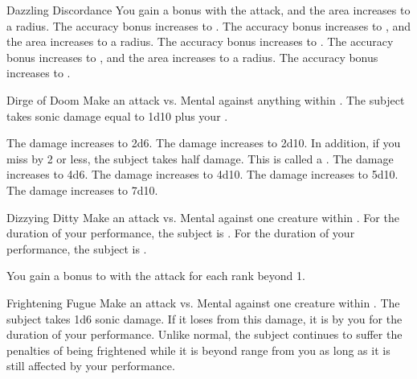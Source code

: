 {\begin{durationability}{Dazzling Discordance}
                \rankline
                 You gain a   bonus with the attack, and the area increases to a \largearea radius.
                 The accuracy bonus increases to .
                 The accuracy bonus increases to , and the area increases to a \hugearea radius.
                 The accuracy bonus increases to .
                 The accuracy bonus increases to , and the area increases to a \gargarea radius.
                 The accuracy bonus increases to .
            \end{durationability}

            \begin{instantability}{Dirge of Doom}
                \rankline
                Make an attack vs. Mental against anything within \medrange.
                \hit The subject takes sonic damage equal to 1d10 plus your .

                \rankline
                 The damage increases to 2d6.
                 The damage increases to 2d10.
                    In addition, if you miss by 2 or less, the subject takes half damage.
                    This is called a .
                 The damage increases to 4d6.
                 The damage increases to 4d10.
                 The damage increases to 5d10.
                 The damage increases to 7d10.
            \end{instantability}

            \begin{durationability}{Dizzying Ditty}
                \rankline
                Make an attack vs. Mental against one creature within \shortrange.
                \hit For the duration of your performance, the subject is \dazed.
                \crit For the duration of your performance, the subject is \stunned.

                \rankline
                You gain a  bonus to  with the attack for each rank beyond 1.
            \end{durationability}

            \begin{durationability}{Frightening Fugue}
                \rankline
                Make an attack vs. Mental against one creature within \medrange.
                \hit The subject takes 1d6 sonic damage.
                If it loses  from this damage, it is \frightened by you for the duration of your performance.
                Unlike normal, the subject continues to suffer the penalties of being frightened while it is beyond \rngmed range from you as long as it is still affected by your performance.


\end{durationability}}
